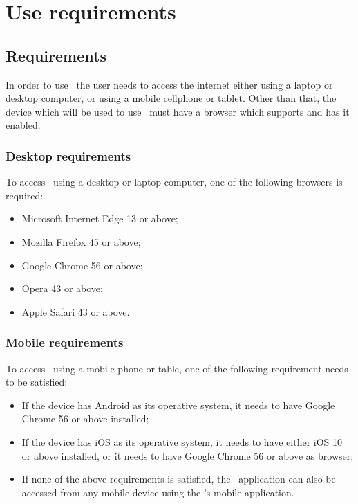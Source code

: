 \section{Use requirements}

\subsection{Requirements}
In order to use \app\ the user needs to access the internet either using a laptop or desktop computer, or using a mobile cellphone or tablet. Other than that, the device which will be used to use \app\ must have a browser which supports  and has it enabled.

\subsubsection{Desktop requirements}
To access \app\ using a desktop or laptop computer, one of the following browsers is required:
\begin{itemize}
	\item Microsoft Internet Edge 13 or above;
	\item Mozilla Firefox 45 or above;
	\item Google Chrome 56 or above;
	\item Opera 43 or above;
	\item Apple Safari 43 or above.
\end{itemize}

\subsubsection{Mobile requirements}
To access \app\ using a mobile phone or table, one of the following requirement needs to be satisfied:
\begin{itemize}
	\item If the device has Android as its operative system, it needs to have Google Chrome 56 or above installed;
	\item If the device has iOS as its operative system, it needs to have either iOS 10 or above installed, or it needs to have Google Chrome 56 or above as browser;
	\item If none of the above requirements is satisfied, the \app{}lication can also be accessed from any mobile device using the 's mobile application.
\end{itemize}

